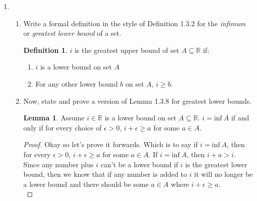 \documentclass{article}
\numberwithin{equation}{subsection}
\theoremstyle{definition}
\newtheorem{definition}{Definition}
\newtheorem{lemma}{Lemma}
\begin{document}
\begin{enumerate}
    \item
    \begin{enumerate}
        \item Write a formal definition in the style of Definition 1.3.2 for the
            \emph{infimum} or \emph{greatest lower bound} of a set.\\

        \begin{definition}
            $i$ is the greatest upper bound of set $A \subseteq \mathbb{R}$ if:\\
            \begin{enumerate}
                \item $i$ is a lower bound on set $A$\\
                \item For any other lower bound $b$ on set $A$, $i \geq b$.
            \end{enumerate}
        \end{definition}

        \item Now, state and prove a version of Lemma 1.3.8 for greatest lower bounds.
            \begin{lemma}
                Assume $i \in \mathbb{R}$ is a lower bound on set $A \subseteq \mathbb{R}$. $i =
                \text{inf}~A$ if and only if for every choice of $\epsilon > 0$, $i +
                \epsilon \geq a$ for some $a \in A$.
                \begin{proof}
                    Okay so let's prove it forwards. Which is to say if $i =
                    \text{inf}~A$, then for every $\epsilon > 0$, $i + \epsilon \geq a$
                    for some  $a \in A$. If $i = \text{inf}~A$, then $i + a > i$. Since
                    any number plus $i$ can't be a lower bound if $i$ is the greatest
                    lower bound, then we know that if any number is added to $i$ it will
                    no longer be a lower bound and there should be some $a \in A$ where $i
                    + \epsilon \geq a$.\\


\end{proof}
\end{lemma}
\end{enumerate}
\end{enumerate}
\end{document}
